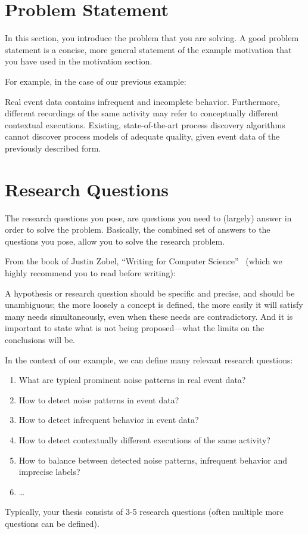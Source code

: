 \section{Problem Statement}
\label{sec:intro_ssec:probs}

In this section, you introduce the problem that you are solving.
A good problem statement is a concise, more general statement of the example motivation that you have used in the motivation section.

For example, in the case of our previous example:

\begin{displayquote}
	Real event data contains infrequent and incomplete behavior.
	Furthermore, different recordings of the same activity may refer to conceptually different contextual executions.
	Existing, state-of-the-art process discovery algorithms cannot discover process models of adequate quality, given event data of the previously described form.
\end{displayquote}

\section{Research Questions}

The research questions you pose, are questions you need to (largely) answer in order to solve the problem.
Basically, the combined set of answers to the questions you pose, allow you to solve the research problem.

From the book of Justin Zobel, \enquote{Writing for Computer Science}~\autocite{DBLP:books/sp/Zobel14} (which we highly recommend you to read before writing):

\begin{displayquote}
	A hypothesis or research question should be specific and precise, and should be
	unambiguous; the more loosely a concept is defined, the more easily it will satisfy
	many needs simultaneously, even when these needs are contradictory. And it is
	important to state what is not being proposed—what the limits on the conclusions
	will be.
\end{displayquote}

In the context of our example, we can define many relevant research questions:
\begin{enumerate}
	\item What are typical prominent noise patterns in real event data?
	\item How to detect noise patterns in event data?
	\item How to detect infrequent behavior in event data?
	\item How to detect contextually different executions of the same activity?
	\item How to balance between detected noise patterns, infrequent behavior and imprecise labels?
	\item \dots
\end{enumerate}
Typically, your thesis consists of 3-5 research questions (often multiple more questions can be defined).

